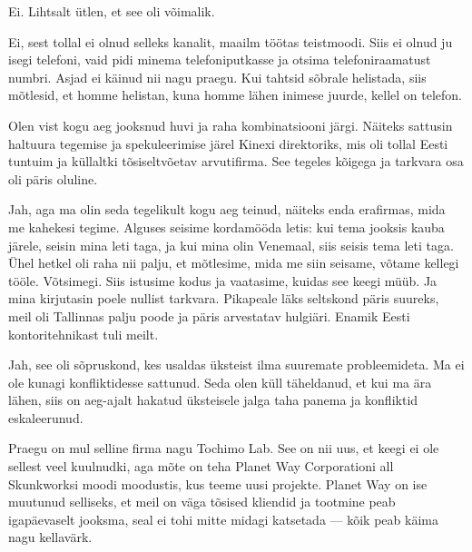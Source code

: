 Ei. Lihtsalt ütlen, et see oli võimalik. 


Ei, sest tollal ei olnud selleks kanalit, maailm töötas teistmoodi. Siis ei olnud ju isegi 
telefoni, vaid pidi minema telefoniputkasse ja otsima telefoniraamatust numbri. 
Asjad ei käinud nii nagu praegu. Kui tahtsid sõbrale helistada, siis mõtlesid, 
et homme helistan, kuna homme lähen inimese juurde, kellel on 
telefon. 


Olen vist kogu aeg jooksnud huvi ja raha kombinatsiooni järgi. Näiteks 
sattusin haltuura tegemise ja spekuleerimise järel Kinexi 
direktoriks, mis oli tollal Eesti tuntuim ja küllaltki 
tõsiseltvõetav arvutifirma. See tegeles kõigega ja tarkvara osa oli päris oluline. 


Jah, aga ma olin seda tegelikult kogu aeg teinud, näiteks enda 
erafirmas, mida me kahekesi tegime. Alguses seisime kordamööda letis: kui tema 
jooksis kauba järele, seisin mina leti taga, ja kui mina olin Venemaal, siis seisis 
tema leti taga. Ühel hetkel oli raha nii palju, et mõtlesime, mida me siin 
seisame, võtame kellegi tööle. Võtsimegi. Siis istusime kodus ja 
vaatasime, kuidas see keegi müüb. Ja mina kirjutasin poele nullist tarkvara. Pikapeale läks
seltskond päris suureks, meil oli Tallinnas palju poode ja 
päris arvestatav hulgiäri. Enamik Eesti kontoritehnikast tuli meilt. 


Jah, see oli sõpruskond, kes usaldas üksteist ilma suuremate probleemideta. Ma ei ole kunagi konfliktidesse 
sattunud. Seda olen küll täheldanud, et kui ma ära lähen, siis on aeg-ajalt 
hakatud üksteisele jalga taha panema ja konfliktid
eskaleerunud.


Praegu on mul selline firma nagu Tochimo Lab. See on nii uus, et keegi ei ole sellest veel kuulnudki, aga mõte on teha
Planet Way Corporationi all Skunkworksi moodi moodustis, kus 
teeme uusi projekte. Planet Way on ise muutunud selliseks, et meil 
on väga tõsised kliendid ja tootmine peab igapäevaselt jooksma, seal ei tohi 
mitte midagi katsetada --- kõik peab käima nagu kellavärk. 

